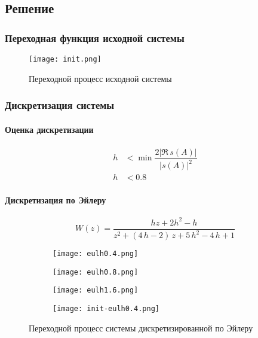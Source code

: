     \subsection*{Решение}
    \subsubsection*{Переходная функция исходной системы}
    \begin{figure}[H]
        \centering
        \texttt{[image: init.png]}
        \caption{Переходной процесс исходной системы}
    \end{figure}

    \subsubsection*{Дискретизация системы}
    \paragraph*{Оценка дискретизации}
    \begin{equation}
        \begin{aligned}
            h &< \min\dfrac{2\left| \Re\,s(A) \right|}{\left| s(A) \right|^2}\\
            h &< 0.8
        \end{aligned}
    \end{equation}

    \paragraph*{Дискретизация по Эйлеру}
    \begin{equation}
        W(z) = \dfrac{hz + 2h^2 - h}{z^2+\left(4\,h-2\right)\,z+5\,h^2-4\,h+1}
    \end{equation}
    \begin{figure}[H]
        \centering
        \begin{subfigure}{0.49\linewidth}
            \texttt{[image: eulh0.4.png]}
        \end{subfigure}
        \begin{subfigure}{0.49\linewidth}
            \texttt{[image: eulh0.8.png]}
        \end{subfigure}
        \begin{subfigure}{0.49\linewidth}
            \texttt{[image: eulh1.6.png]}
        \end{subfigure}
        \begin{subfigure}{0.49\linewidth}
            \texttt{[image: init-eulh0.4.png]}
        \end{subfigure}
        \caption{Переходной процесс системы дискретизированной по Эйлеру}
    \end{figure}

